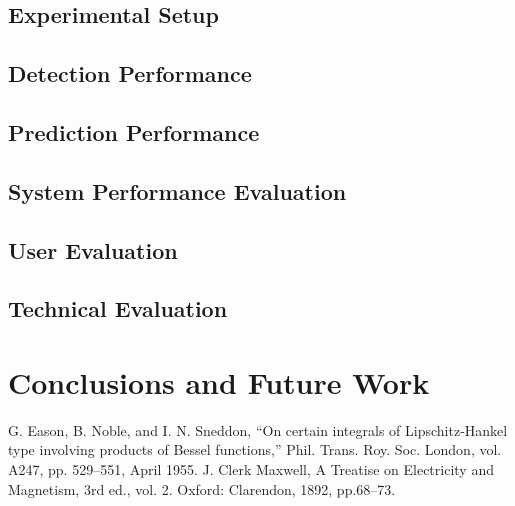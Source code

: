 \documentclass[conference]{IEEEtran}
\begin{document}
\subsection{Experimental Setup}


\subsection{Detection Performance}



\subsection{Prediction Performance}


\subsection{System Performance Evaluation}



\subsection{User Evaluation}



\subsection{Technical Evaluation}


\section{Conclusions and Future Work}

\begin{thebibliography}{00}
 G. Eason, B. Noble, and I. N. Sneddon, ``On certain integrals of Lipschitz-Hankel type involving products of Bessel functions,'' Phil. Trans. Roy. Soc. London, vol. A247, pp. 529--551, April 1955.
 J. Clerk Maxwell, A Treatise on Electricity and Magnetism, 3rd ed., vol. 2. Oxford: Clarendon, 1892, pp.68--73.
\end{thebibliography}
\end{document}
